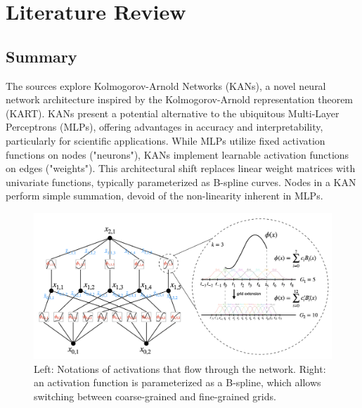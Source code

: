 \chapter{Literature Review}
 
\setcounter{equation}{0}


\section{Summary}

The sources explore Kolmogorov-Arnold Networks (KANs), a novel neural network architecture inspired by the Kolmogorov-Arnold representation theorem (KART). KANs present a potential alternative to the ubiquitous Multi-Layer Perceptrons (MLPs), offering advantages in accuracy and interpretability, particularly for scientific applications.
While MLPs utilize fixed activation functions on nodes ("neurons"), KANs implement learnable activation functions on edges ("weights"). This architectural shift replaces linear weight matrices with univariate functions, typically parameterized as B-spline curves. Nodes in a KAN perform simple summation, devoid of the non-linearity inherent in MLPs.

\begin{figure}[t]
    \centering
    \includegraphics[width=0.9\linewidth]{Images/spline_notation.png}
    \caption{Left: Notations of activations that flow through the network. Right: an activation function is parameterized as a B-spline, which allows switching between coarse-grained and fine-grained grids.}
    \label{fig:spline-notation}
\end{figure}

